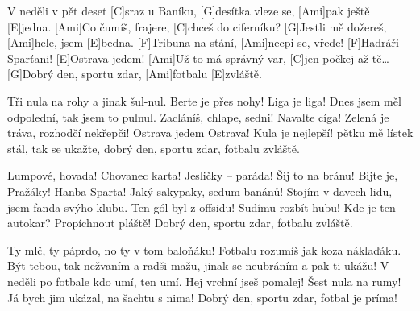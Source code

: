 
\sloka
[Ami]V neděli v pět deset [C]sraz u Baníku,
[G]desítka vleze se, [Ami]pak ještě [E]jedna.
[Ami]Co čumíš, frajere, [C]chceš do ciferníku?
[G]Jestli mě dožereš, [Ami]hele, jsem [E]bedna.
[F]Tribuna na stání, [Ami]necpi se, vřede!
[F]Hadráři Sparťani! [E]Ostrava jedem!
[Ami]Už to má správný var, [C]jen počkej až tě…
[G]Dobrý den, sportu zdar, [Ami]fotbalu [E]zvláště.

\sloka
Tři nula na rohy a jinak šul-nul.
Berte je přes nohy! Liga je liga!
Dnes jsem měl odpolední, tak jsem to pulnul.
Zacláníš, chlape, sedni! Navalte cíga!
Zelená je tráva, rozhodčí nekřepči!
Ostrava jedem Ostrava! Kula je nejlepší!
pětku mě lístek stál, tak se ukažte,
dobrý den, sportu zdar, fotbalu zvláště.

\sloka
Lumpové, hovada! Chovanec karta!
Jesličky – paráda! Šij to na bránu!
Bijte je, Pražáky! Hanba Sparta!
Jaký sakypaky, sedum banánů!
Stojím v davech lidu, jsem fanda svýho klubu.
Ten gól byl z offsidu! Sudímu rozbít hubu!
Kde je ten autokar? Propíchnout pláště!
Dobrý den, sportu zdar, fotbalu zvláště.

\sloka
Ty mlč, ty páprdo, no ty v tom baloňáku!
Fotbalu rozumíš jak koza náklaďáku.
Být tebou, tak nežvaním a radši mažu,
jinak se neubráním a pak ti ukážu!
V neděli po fotbale kdo umí, ten umí.
Hej vrchní jseš pomalej! Šest nula na rumy!
Já bych jim ukázal, na šachtu s nima!
Dobrý den, sportu zdar, fotbal je príma!
